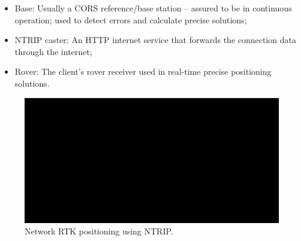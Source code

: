 \begin{itemize}
    \item Base: Usually a CORS reference/base station -- assured to be in continuous operation; used to detect errors and calculate precise solutions;
    \item NTRIP caster: An HTTP internet service that forwards the connection data through the internet;
    \item Rover: The client's rover receiver used in real-time precise positioning solutions.
\end{itemize}

\begin{figure}[ht]
	\centering
	\includegraphics[width=1.0\textwidth]{Chapters/Figures/demo.png}
	\caption{Network RTK positioning using NTRIP.}
	\label{fig:ntrip_network}
\end{figure}

